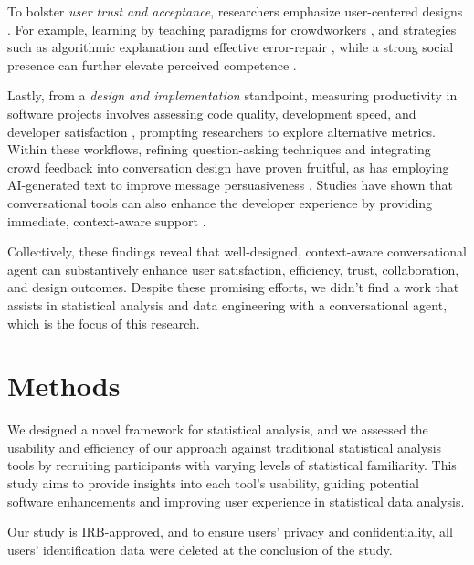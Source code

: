 \documentclass{article}
\begin{document}
To bolster \textit{user trust and acceptance}, researchers emphasize user-centered designs \citep{schmitt2022, Amershi2019}. For example, learning by teaching paradigms for crowdworkers \citep{Chhibber2022}, and strategies such as algorithmic explanation and effective error-repair \citep{Do2023, Do2022}, while a strong social presence can further elevate perceived competence \citep{schmid2022}. 

Lastly, from a \textit{design and implementation} standpoint, measuring productivity in software projects involves assessing code quality, development speed, and developer satisfaction \citep{McConnell2006, Sadowski2015}, prompting researchers to explore alternative metrics. Within these workflows, refining question-asking techniques \citep{Hu2024} and integrating crowd feedback into conversation design \citep{choi2021} have proven fruitful, as has employing AI-generated text to improve message persuasiveness \citep{karinshak2023}. Studies have shown that conversational tools can also enhance the developer experience by providing immediate, context-aware support \citep{Wang2018}. 

Collectively, these findings reveal that well-designed, context-aware conversational agent can substantively enhance user satisfaction, efficiency, trust, collaboration, and design outcomes. Despite these promising efforts, we didn't find a work that assists in statistical analysis and data engineering with a conversational agent, which is the focus of this research.

\section{Methods}
We designed a novel framework for statistical analysis, and we assessed the usability and efficiency of our approach against traditional statistical analysis tools by recruiting participants with varying levels of statistical familiarity. This study aims to provide insights into each tool's usability, guiding potential software enhancements and improving user experience in statistical data analysis.

Our study is IRB-approved, and to ensure users' privacy and confidentiality, all users' identification data were deleted at the conclusion of the study.
\end{document}
